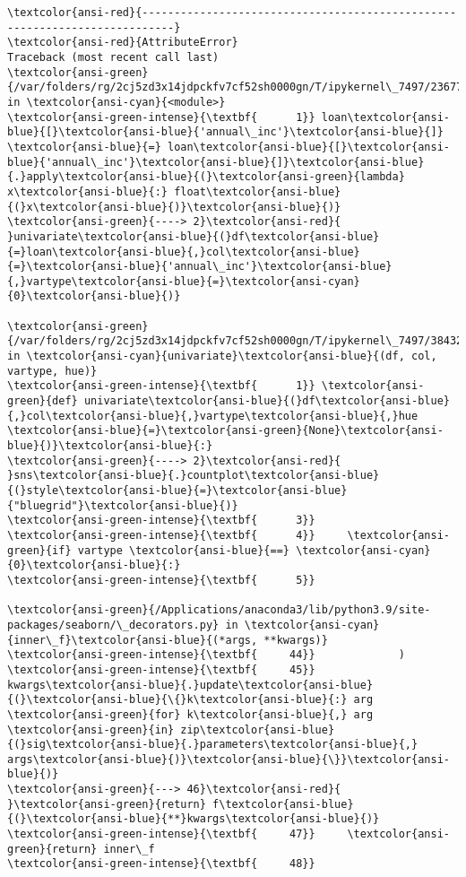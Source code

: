 \documentclass[11pt]{article}
\begin{document}
    \begin{Verbatim}[commandchars=\\\{\}, frame=single, framerule=2mm, rulecolor=\color{outerrorbackground}]
\textcolor{ansi-red}{---------------------------------------------------------------------------}
\textcolor{ansi-red}{AttributeError}                            Traceback (most recent call last)
\textcolor{ansi-green}{/var/folders/rg/2cj5zd3x14jdpckfv7cf52sh0000gn/T/ipykernel\_7497/2367768616.py} in \textcolor{ansi-cyan}{<module>}
\textcolor{ansi-green-intense}{\textbf{      1}} loan\textcolor{ansi-blue}{[}\textcolor{ansi-blue}{'annual\_inc'}\textcolor{ansi-blue}{]} \textcolor{ansi-blue}{=} loan\textcolor{ansi-blue}{[}\textcolor{ansi-blue}{'annual\_inc'}\textcolor{ansi-blue}{]}\textcolor{ansi-blue}{.}apply\textcolor{ansi-blue}{(}\textcolor{ansi-green}{lambda} x\textcolor{ansi-blue}{:} float\textcolor{ansi-blue}{(}x\textcolor{ansi-blue}{)}\textcolor{ansi-blue}{)}
\textcolor{ansi-green}{----> 2}\textcolor{ansi-red}{ }univariate\textcolor{ansi-blue}{(}df\textcolor{ansi-blue}{=}loan\textcolor{ansi-blue}{,}col\textcolor{ansi-blue}{=}\textcolor{ansi-blue}{'annual\_inc'}\textcolor{ansi-blue}{,}vartype\textcolor{ansi-blue}{=}\textcolor{ansi-cyan}{0}\textcolor{ansi-blue}{)}

\textcolor{ansi-green}{/var/folders/rg/2cj5zd3x14jdpckfv7cf52sh0000gn/T/ipykernel\_7497/3843230007.py} in \textcolor{ansi-cyan}{univariate}\textcolor{ansi-blue}{(df, col, vartype, hue)}
\textcolor{ansi-green-intense}{\textbf{      1}} \textcolor{ansi-green}{def} univariate\textcolor{ansi-blue}{(}df\textcolor{ansi-blue}{,}col\textcolor{ansi-blue}{,}vartype\textcolor{ansi-blue}{,}hue \textcolor{ansi-blue}{=}\textcolor{ansi-green}{None}\textcolor{ansi-blue}{)}\textcolor{ansi-blue}{:}
\textcolor{ansi-green}{----> 2}\textcolor{ansi-red}{     }sns\textcolor{ansi-blue}{.}countplot\textcolor{ansi-blue}{(}style\textcolor{ansi-blue}{=}\textcolor{ansi-blue}{"bluegrid"}\textcolor{ansi-blue}{)}
\textcolor{ansi-green-intense}{\textbf{      3}} 
\textcolor{ansi-green-intense}{\textbf{      4}}     \textcolor{ansi-green}{if} vartype \textcolor{ansi-blue}{==} \textcolor{ansi-cyan}{0}\textcolor{ansi-blue}{:}
\textcolor{ansi-green-intense}{\textbf{      5}} 

\textcolor{ansi-green}{/Applications/anaconda3/lib/python3.9/site-packages/seaborn/\_decorators.py} in \textcolor{ansi-cyan}{inner\_f}\textcolor{ansi-blue}{(*args, **kwargs)}
\textcolor{ansi-green-intense}{\textbf{     44}}             )
\textcolor{ansi-green-intense}{\textbf{     45}}         kwargs\textcolor{ansi-blue}{.}update\textcolor{ansi-blue}{(}\textcolor{ansi-blue}{\{}k\textcolor{ansi-blue}{:} arg \textcolor{ansi-green}{for} k\textcolor{ansi-blue}{,} arg \textcolor{ansi-green}{in} zip\textcolor{ansi-blue}{(}sig\textcolor{ansi-blue}{.}parameters\textcolor{ansi-blue}{,} args\textcolor{ansi-blue}{)}\textcolor{ansi-blue}{\}}\textcolor{ansi-blue}{)}
\textcolor{ansi-green}{---> 46}\textcolor{ansi-red}{         }\textcolor{ansi-green}{return} f\textcolor{ansi-blue}{(}\textcolor{ansi-blue}{**}kwargs\textcolor{ansi-blue}{)}
\textcolor{ansi-green-intense}{\textbf{     47}}     \textcolor{ansi-green}{return} inner\_f
\textcolor{ansi-green-intense}{\textbf{     48}} 


\end{Verbatim}
\end{document}
